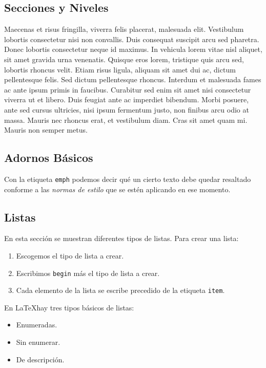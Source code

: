 \documentclass{article}
\begin{document}
\subsection{Secciones y Niveles}
\label{subsec:secciones}

Maecenas et risus fringilla, viverra felis placerat, malesuada elit. Vestibulum lobortis consectetur nisi non convallis. Duis consequat suscipit arcu sed pharetra. Donec lobortis consectetur neque id maximus. In vehicula lorem vitae nisl aliquet, sit amet gravida urna venenatis. Quisque eros lorem, tristique quis arcu sed, lobortis rhoncus velit. Etiam risus ligula, aliquam sit amet dui ac, dictum pellentesque felis. Sed dictum pellentesque rhoncus. Interdum et malesuada fames ac ante ipsum primis in faucibus. Curabitur sed enim sit amet nisi consectetur viverra ut et libero. Duis feugiat ante ac imperdiet bibendum. Morbi posuere, ante sed cursus ultricies, nisi ipsum fermentum justo, non finibus arcu odio at massa. Mauris nec rhoncus erat, et vestibulum diam. Cras sit amet quam mi. Mauris non semper metus.

\subsection{Adornos Básicos}

Con la etiqueta \texttt{emph} podemos decir qué un cierto texto debe quedar resaltado conforme a las \emph{normas de estilo} que se estén aplicando en ese momento.

\subsection{Listas}

En esta sección se muestran diferentes tipos de listas. Para crear una lista:

\begin{enumerate}
	\item Escogemos el tipo de lista a crear.
	\item Escribimos \texttt{begin} más el tipo de lista a crear. 
	\item Cada elemento de la lista se escribe precedido de la etiqueta \texttt{item}.
\end{enumerate}

En \LaTeX hay tres tipos básicos de listas: 

\begin{itemize}
	\item Enumeradas.
	\item Sin enumerar. 
	\item De descripción.
\end{itemize}
\end{document}

